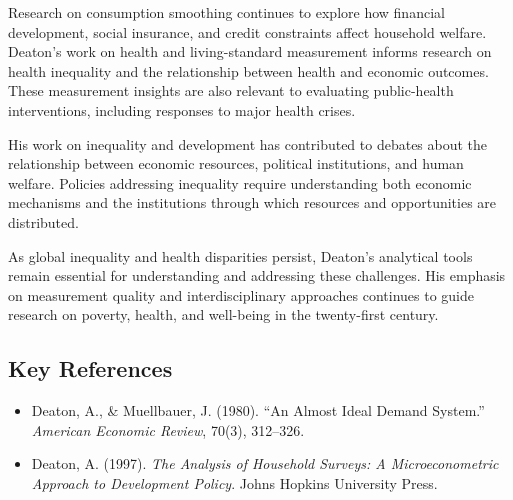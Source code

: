 Research on consumption smoothing continues to explore how financial development,
social insurance, and credit constraints affect household welfare. Deaton's work
on health and living-standard measurement informs research on health inequality
and the relationship between health and economic outcomes. These measurement
insights are also relevant to evaluating public-health interventions, including
responses to major health crises.

His work on inequality and development has contributed to debates about the
relationship between economic resources, political institutions, and human
welfare. Policies addressing inequality require understanding both economic
mechanisms and the institutions through which resources and opportunities are
distributed.

As global inequality and health disparities persist, Deaton's analytical tools
remain essential for understanding and addressing these challenges. His emphasis
on measurement quality and interdisciplinary approaches continues to guide
research on poverty, health, and well-being in the twenty-first century.

\subsection*{Key References}
\begin{itemize}
    \item Deaton, A., \& Muellbauer, J. (1980). ``An Almost Ideal Demand System.'' \textit{American Economic Review}, 70(3), 312--326.
    \item Deaton, A. (1997). \textit{The Analysis of Household Surveys: A Microeconometric Approach to Development Policy}. Johns Hopkins University Press.
\end{itemize}
